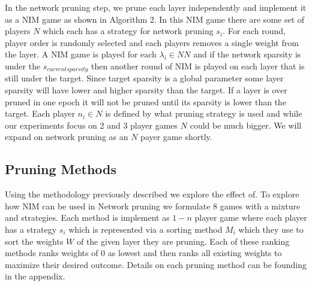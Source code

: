 \documentclass[runningheads]{llncs}
\begin{document}
In the network pruning step, we prune each layer independently and implement it as a NIM game as shown in Algorithm 2. In this NIM game there are some set of players $N$ which each has a strategy for network pruning $s_i$. For each round, player order is randomly selected and each players removes a single weight from the layer. A NIM game is played for each $\lambda_i \in NN$ and if the network sparsity is under the $s_{current sparsity}$ then another round of NIM is played on each layer that is still under the target. Since target sparsity is a global parameter some layer sparsity will have lower and higher sparsity than the target. If a layer is over pruned in one epoch it will not be pruned until its sparsity is lower than the target.  Each player $n_i \in N$ is defined by what pruning strategy is used and while our experiments focus on 2 and 3 player games $N$ could be much bigger. We will expand on network pruning as an $N$ payer game shortly.
\subsection{Pruning Methods}
Using the methodology previously described we explore the effect of. To explore how NIM can be used in Network pruning we formulate 8 games with a mixture and strategies. Each method is implement as $1-n$ player game where each player has a strategy $s_i$ which is represented via a sorting method $M_i$ which they use to sort the weights $W$ of the given layer they are pruning. Each of these ranking methods ranks weights of 0 as lowest and then ranks all existing weights to maximize their desired outcome. Details on each pruning method can be founding in the appendix.
\end{document}
